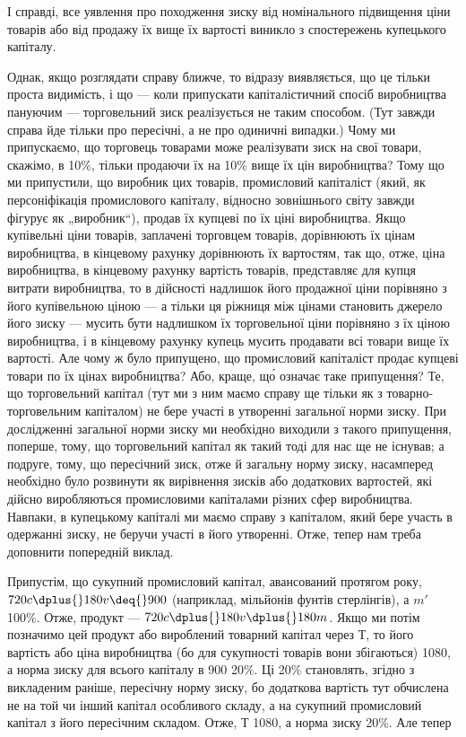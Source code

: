 \parcont{}  %
І справді, все уявлення про походження зиску від номінального
підвищення ціни товарів або від продажу їх вище їх вартості
виникло з спостережень купецького капіталу.

Однак, якщо розглядати справу ближче, то відразу виявляється,
що це тільки проста видимість, і що — коли припускати
капіталістичний спосіб виробництва пануючим — торговельний
зиск реалізується не таким способом. (Тут завжди справа
йде тільки про пересічні, а не про одиничні випадки.) Чому
ми припускаємо, що торговець товарами може реалізувати зиск
на свої товари, скажімо, в 10\%, тільки продаючи їх на 10\%
вище їх цін виробництва? Тому що ми припустили, що виробник
цих товарів, промисловий капіталіст (який, як персоніфікація
промислового капіталу, відносно зовнішнього світу завжди
фігурує як „виробник“), продав їх купцеві по їх ціні виробництва.
Якщо купівельні ціни товарів, заплачені торговцем товарів, дорівнюють
їх цінам виробництва, в кінцевому рахунку дорівнюють
їх вартостям, так що, отже, ціна виробництва, в кінцевому рахунку
вартість товарів, представляє для купця витрати виробництва, то
в дійсності надлишок його продажної ціни порівняно з його купівельною
ціною — а тільки ця ріжниця між цінами становить джерело
його зиску — мусить бути надлишком їх торговельної ціни
порівняно з їх ціною виробництва, і в кінцевому рахунку купець
мусить продавати всі товари вище їх вартості. Але чому ж було
припущено, що промисловий капіталіст продає купцеві товари по
їх цінах виробництва? Або, краще, що́ означає таке припущення?
Те, що торговельний капітал (тут ми з ним маємо справу
ще тільки як з товарно-торговельним капіталом) не бере участі
в утворенні загальної норми зиску. При дослідженні загальної
норми зиску ми необхідно виходили з такого припущення, поперше,
тому, що торговельний капітал як такий тоді для нас
ще не існував; а подруге, тому, що пересічний зиск, отже й загальну
норму зиску, насамперед необхідно було розвинути як
вирівнення зисків або додаткових вартостей, які дійсно виробляються
промисловими капіталами різних сфер виробництва.
Навпаки, в купецькому капіталі ми маємо справу з капіталом,
який бере участь в одержанні зиску, не беручи участі в його
утворенні. Отже, тепер нам треба доповнити попередній виклад.

Припустім, що сукупний промисловий капітал, авансований
протягом року, \deq{} $720 c \dplus{} 180 v \deq{} 900$ (наприклад, мільйонів фунтів
стерлінгів), а $m'$ \deq{} 100\%. Отже, продукт — $720 c \dplus{} 180 v \dplus{} 180 m$.
Якщо ми потім позначимо цей продукт або вироблений товарний
капітал через $Т$, то його вартість або ціна виробництва
(бо для сукупності товарів вони збігаються) \deq{} 1080, а норма
зиску для всього капіталу в 900 \deq{} 20\%. Ці 20\% становлять,
згідно з викладеним раніше, пересічну норму зиску, бо додаткова
вартість тут обчислена не на той чи інший капітал особливого
складу, а на сукупний промисловий капітал з його пересічним
складом. Отже, $Т$ \deq{} 1080, а норма зиску \deq{} 20\%. Але тепер
\parbreak{}  %
